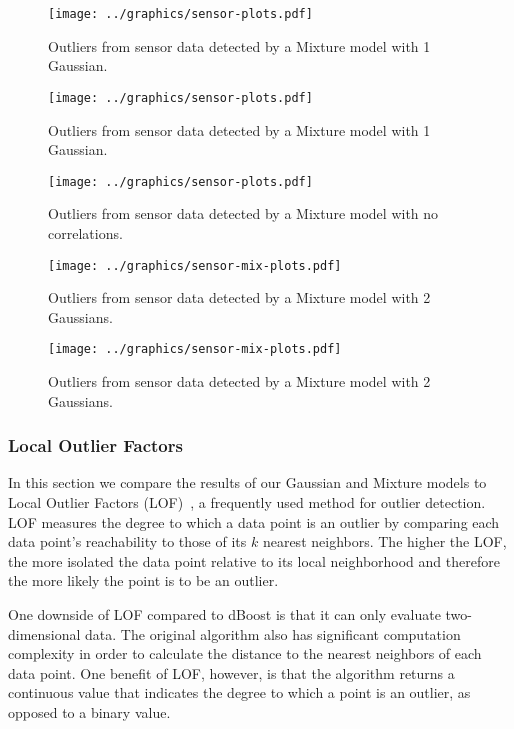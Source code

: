 \begin{figure}[h]
\centering
\texttt{[image: ../graphics/sensor-plots.pdf]}
\caption{Outliers from sensor data detected by a Mixture model with 1 Gaussian.}
\label{fig:sensors_1}
\end{figure}
\begin{figure}[h]
\centering
\texttt{[image: ../graphics/sensor-plots.pdf]}
\caption{Outliers from sensor data detected by a Mixture model with 1 Gaussian.}
\label{fig:sensors_2}
\end{figure}
\begin{figure}[h]
\centering
\texttt{[image: ../graphics/sensor-plots.pdf]}
\caption{Outliers from sensor data detected by a Mixture model with no correlations.}
\label{fig:sensors_nocorr}
\end{figure}
\begin{figure}[h]
\centering
\texttt{[image: ../graphics/sensor-mix-plots.pdf]}
\caption{Outliers from sensor data detected by a Mixture model with 2 Gaussians.}
\label{fig:sensors_3}
\end{figure}
\begin{figure}[h]
\centering
\texttt{[image: ../graphics/sensor-mix-plots.pdf]}
\caption{Outliers from sensor data detected by a Mixture model with 2 Gaussians.}
\label{fig:sensors_4}
\end{figure}

\subsubsection{Local Outlier Factors}
\label{sec:lof-evaluation}

In this section we compare the results of our Gaussian and Mixture models to Local Outlier Factors (LOF)~\cite{Breunig2000}, a frequently used method for outlier detection.
LOF measures the degree to which a data point is an outlier by comparing each data point's reachability to those of its $k$ nearest neighbors.
The higher the LOF, the more isolated the data point relative to its local neighborhood and therefore the more likely the point is to be an outlier.

One downside of LOF compared to dBoost is that it can only evaluate two-dimensional data.
The original algorithm also has significant computation complexity in order to calculate the distance to the nearest neighbors of each data point.
One benefit of LOF, however, is that the algorithm returns a continuous value that indicates the degree to which a point is an outlier, as opposed to a binary value.

